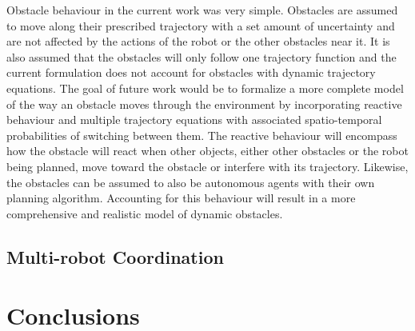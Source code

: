 Obstacle behaviour in the current work was very simple. Obstacles are assumed
to move along their prescribed trajectory with a set amount of uncertainty and
are not affected by the actions of the robot or the other obstacles near it. It
is also assumed that the obstacles will only follow one trajectory function and
the current formulation does not account for obstacles with dynamic trajectory
equations. The goal of future work would be to formalize a more complete model
of the way an obstacle moves through the environment by incorporating reactive
behaviour and multiple trajectory equations with associated spatio-temporal
probabilities of switching between them. The reactive behaviour will encompass
how the obstacle will react when other objects, either other obstacles or the
robot being planned, move toward the obstacle or interfere with its trajectory.
Likewise, the obstacles can be assumed to also be autonomous agents with their
own planning algorithm. Accounting for this behaviour will result in a more
comprehensive and realistic model of dynamic obstacles.

\subsection{Multi-robot Coordination}

\section{Conclusions}


